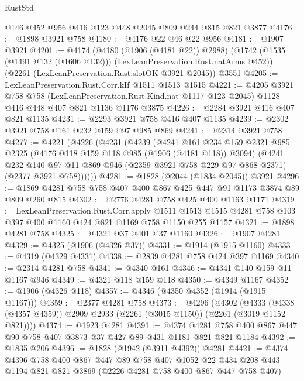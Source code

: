 \begin{lexlean}{RustStd}
\begin{coremodule}
    @146
    @452
    @956
    @416
    @123
    @448
    @2045
    @809
    @244
    @815
    @821
    @3877
@4176 := @1898 @3921 @758
@4180 := @4176 @22 @46 @22 @956
@4181 := @1907 @3921
@4201 := @4174
    (@4180 (@1906 (@4181 @22)) @2988)
    (@1742 (@1535 (@1491 @132 (@1606 @132))) (LexLeanPreservation.Rust.natArms @452))
    (@2261 (LexLeanPreservation.Rust.slotOK @3921 @2045))
    @3551
@4205 := LexLeanPreservation.Rust.Corr.kIf @1511 @1513 @1515
@4221 := @4205
    @3921
    @758
    @758
    (LexLeanPreservation.Rust.Kind.nat @1117 @123 @2045)
    @1128
    @416
    @448
    @407
    @821
    @1136
    @1176
    @3875
@4226 := @2284 @3921 @416 @407 @821 @1135
@4231 := @2293 @3921 @758 @416 @407 @1135
@4239 := @2302 @3921 @758 @161 @232 @159 @97 @985 @869
@4241 := @2314 @3921 @758
@4277 := @4221
    (@4226
      (@4231
        (@4239
          (@4241
            @161
            @234
            @159
            @2321
            @985
            @2325
            (@4176 @118 @159 @118 @985 (@1906 (@4181 @118)) @3094)
            (@4241
              @232
              @140
              @97
              @11
              @869
              @946
              (@2359 @3921 @758 @229 @97 @868 @2371)
              (@2377 @3921 @758))))))
@4281 := @1828 (@2044 (@1834 @2045)) @3921
@4296 := @1869 @4281 @758 @758 @407 @400 @867 @425 @447 @91 @1173 @3874 @89 @809 @260 @815
@4302 := @2776 @4281 @758 @425 @400 @1163 @1171
@4319 := LexLeanPreservation.Rust.Corr.apply
    @1511
    @1513
    @1515
    @4281
    @758
    @103
    @397
    @400
    @1160
    @424
    @821
    @1169
    @758
    @1150
    @255
    @1157
@4321 := @1898 @4281 @758
@4325 := @4321 @37 @401 @37 @1160
@4326 := @1907 @4281
@4329 := @4325 (@1906 (@4326 @37))
@4331 := @1914 (@1915 @1160)
@4333 := @4319 (@4329 @4331)
@4338 := @2839 @4281 @758 @424 @397 @1169
@4340 := @2314 @4281 @758
@4341 := @4340 @161
@4346 := @4341 @140 @159 @11 @1167 @946
@4349 := @4321 @118 @159 @118
@4350 := @4349 @1167
@4352 := @1906 (@4326 @118)
@4357 := @4346 (@4350 @4352 (@1914 (@1915 @1167)))
@4359 := @2377 @4281 @758
@4373 := @4296
    (@4302
      (@4333 (@4338 (@4357 @4359)) @2909 @2933 (@2261 (@3015 @1150)) (@2261 (@3019 @1152 @821))))
@4374 := @1923 @4281
@4391 := @4374 @4281 @758 @400 @867 @447 @90 @758 @407 @3873 @37 @427 @89 @431 @1181 @821 @821 @1184
@4392 := @1835 @206
@4396 := @1828 (@1942 (@3911 @4392)) @4281
@4421 := @4374
    @4396
    @758
    @400
    @867
    @447
    @89
    @758
    @407
    @1052
    @22
    @434
    @208
    @443
    @1194
    @821
    @821
    @3869
    (@2226 @4281 @758 @400 @867 @447 @758 @407)

\end{coremodule}
\end{lexlean}
